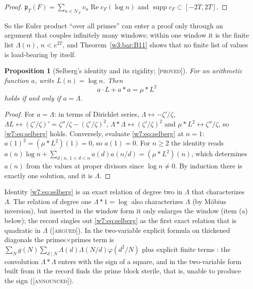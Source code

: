 \documentclass[11pt]{amsart}
\newtheorem{proposition}[theorem]{Proposition}
\theoremstyle{definition}
\theoremstyle{remark}
\numberwithin{equation}{section}
\DeclareMathOperator{\Rel}{Re}
\DeclareMathOperator{\supp}{supp}
\newcommand{\cF}{c_F}                                  %
\newcommand{\NT}{\mathcal{N}_T}                        %
\newcommand{\pT}{\mathfrak{p}_T}                       %
\newcommand{\stag}[1]{\textsc{[#1]}}
\newcommand{\PROVED}{\stag{proved}}
\newcommand{\ARGUED}{\stag{argued}}
\newcommand{\ANNOUNCED}{\stag{announced}}
\begin{document}
\begin{proof}
$\pT(F)=\sum_{n\in\NT}v_n\Rel\cF(\log n)$ and $\supp\cF\subset[-2T,2T]$.
\end{proof}

So the Euler product ``over all primes'' can enter a proof only through an argument that couples infinitely
many windows; within one window it is the finite list $\Lambda(n)$, $n<e^{2T}$, and Theorem~\ref{w3:bar:B11}
shows that no finite list of values is load-bearing by itself.

\begin{proposition}[Selberg's identity and its rigidity; \PROVED]\label{w7:prop:selberg}
For an arithmetic function $a$, write $L(n)=\log n$. Then
\begin{equation}\label{w7:eq:selberg}
  a\cdot L+a\ast a=\mu\ast L^2
\end{equation}
holds if and only if $a=\Lambda$.
\end{proposition}

\begin{proof}
For $a=\Lambda$: in terms of Dirichlet series, $\Lambda\leftrightarrow-\zeta'/\zeta$, $\Lambda L\leftrightarrow
(\zeta'/\zeta)'=\zeta''/\zeta-(\zeta'/\zeta)^2$, $\Lambda\ast\Lambda\leftrightarrow(\zeta'/\zeta)^2$ and
$\mu\ast L^2\leftrightarrow\zeta''/\zeta$, so \eqref{w7:eq:selberg} holds. Conversely, evaluate
\eqref{w7:eq:selberg} at $n=1$: $a(1)^2=(\mu\ast L^2)(1)=0$, so $a(1)=0$. For $n\ge2$ the identity reads
$a(n)\log n+\sum_{d\mid n,\,1<d<n}a(d)a(n/d)=(\mu\ast L^2)(n)$, which determines $a(n)$ from the values at
proper divisors since $\log n\ne0$. By induction there is exactly one solution, and it is $\Lambda$.
\end{proof}

Identity \eqref{w7:eq:selberg} is an exact relation of degree two in $\Lambda$ that characterizes $\Lambda$.
The relation of degree one $\Lambda\ast1=\log$ also characterizes $\Lambda$ (by M\"obius inversion), but
inserted in the window form it only enlarges the window (item (a) below); the record singles out
\eqref{w7:eq:selberg} as the first exact relation that is quadratic in $\Lambda$ (\ARGUED). In the two-variable explicit formula on
thickened diagonals the primes$\times$primes term is $\sum_N g(N)\sum_{d\mid N}\Lambda(d)\Lambda(N/d)\varphi(d^2/N)$
plus explicit finite terms \cite[Theorem~5.4]{P28}: the convolution $\Lambda\ast\Lambda$ enters with the sign of
a square, and in the two-variable form built from it the record finds the prime block sterile, that is, unable
to produce the sign (\ANNOUNCED).
\end{document}

